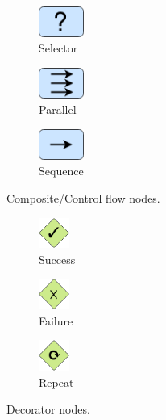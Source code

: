 \begin{figure}[ht]
\centering
\begin{subfigure}[t]{3cm}
\centering
\includegraphics[height=1cm]{Images/images/bt/selector.drawio.png} 
\caption{Selector}
\label{fig:bt_selector}
\end{subfigure}
\begin{subfigure}[t]{3cm}
\centering
\includegraphics[height=1cm]{Images/images/bt/parallel.drawio.png} 
\caption{Parallel}
\label{fig:bt_parallel}
\end{subfigure}
\begin{subfigure}[t]{3cm}
\centering
\includegraphics[height=1cm]{Images/images/bt/sequence.drawio.png} 
\caption{Sequence}
\label{fig:bt_sequence}
\end{subfigure}
\caption{Composite/Control flow nodes.}
\label{fig:bt_control_flow_nodes}
\end{figure}

\begin{figure}[ht]
\centering
\begin{subfigure}[t]{3.5cm}
\centering
\includegraphics[height=1cm]{Images/images/bt/success.drawio.png} 
\caption{Success}
\label{fig:bt_success}
\end{subfigure}
\begin{subfigure}[t]{3.5cm}
\centering
\includegraphics[height=1cm]{Images/images/bt/failure.drawio.png} 
\caption{Failure}
\label{fig:bt_failure}
\end{subfigure}
\begin{subfigure}[t]{3.5cm}
\centering
\includegraphics[height=1cm]{Images/images/bt/repeat.drawio.png} 
\caption{Repeat}
\label{fig:bt_repeat}
\end{subfigure}
\caption{Decorator nodes.}
\label{fig:bt_decorator_nodes}
\end{figure}

